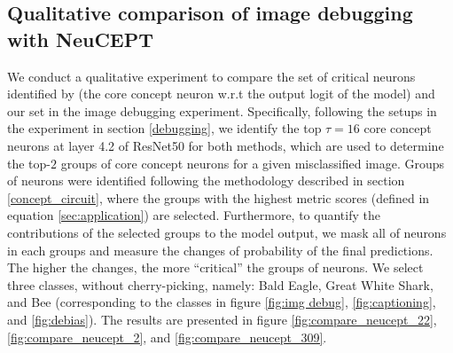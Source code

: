 \subsection{{Qualitative comparison of image debugging with NeuCEPT}}
\label{sec:compare_neucept_img_debugging}
{We conduct a qualitative experiment to compare the set of critical neurons identified by \citet{NEUCEPT} (the core concept neuron w.r.t the output logit of the model) and our set in the image debugging experiment. Specifically, following the setups in the experiment in section \ref{debugging}, we identify the top $\tau = 16$ core concept neurons at layer 4.2 of ResNet50 for both methods, which are used to determine the top-$2$ groups of core concept neurons for a given misclassified image. Groups of neurons were identified following the methodology described in section \ref{concept_circuit}, where the groups with the highest metric scores (defined in equation \ref{sec:application}) are selected. Furthermore, to quantify the contributions of the selected groups to the model output, we mask all of neurons in each groups and measure the changes of probability of the final predictions. The higher the changes, the more ``critical'' the groups of neurons.}
We select three classes, without cherry-picking, namely: Bald Eagle, Great White Shark, and Bee (corresponding to the classes in figure \ref{fig:img debug}, \ref{fig:captioning}, and \ref{fig:debias}). The results are presented in figure \ref{fig:compare_neucept_22}, \ref{fig:compare_neucept_2}, and \ref{fig:compare_neucept_309}.

